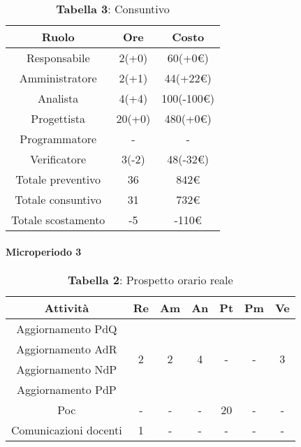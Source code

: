 \begin{table}[H]
	\centering
	\renewcommand{\arraystretch}{1.5}
	\begin{tabular}{|c|c|c|}
		\hline
		\rowcolor{lighter-grayer}
		Ruolo & Ore & Costo \\ \hline
		Responsabile & 2(+0) & 60(+0\euro) \\ \hline
		Amministratore & 2(+1) & 44(+22\euro) \\ \hline
		Analista & 4(+4) & 100(-100\euro) \\ \hline
		Progettista & 20(+0) & 480(+0\euro) \\ \hline
		Programmatore & - & - \\ \hline
		Verificatore & 3(-2) & 48(-32\euro) \\ \hline
		Totale preventivo & 36 & 842\euro \\ \hline
		Totale consuntivo & 31 & 732\euro \\ \hline
		Totale scostamento & -5 & -110\euro \\ \hline
	\end{tabular}
	\caption*{\textbf{Tabella 3}: Consuntivo\\}
\end{table}

\paragraph{Microperiodo 3}
\begin{table}[H]
	\centering
	\begin{tabular}{|c|c|c|c|c|c|c|}
		\hline
		\rowcolor{lighter-grayer}
		\textbf{Attività}     & \textbf{Re}        & \textbf{Am}        & \textbf{An}        & \textbf{Pt}        & \textbf{Pm}        & \textbf{Ve}        \\ \hline
		Aggiornamento PdQ     & \multirow{4}{*}{2} & \multirow{4}{*}{2} & \multirow{4}{*}{4} & \multirow{4}{*}{-} & \multirow{4}{*}{-} & \multirow{4}{*}{3} \\ \cline{1-1}
		Aggiornamento AdR     &                    &                    &                    &                    &                    &                    \\ \cline{1-1}
		Aggiornamento NdP     &                    &                    &                    &                    &                    &                    \\ \cline{1-1}
		Aggiornamento PdP     &                    &                    &                    &                    &                    &                    \\ \hline
		Poc                   & -                  & -                  & -                  & 20                 & -                  & -                  \\ \hline
		Comunicazioni docenti & 1                  & -                  & -                  & -                  & -                  & -                  \\ \hline
	\end{tabular}
\caption*{\textbf{Tabella 2}: Prospetto orario reale\\}
\end{table}

